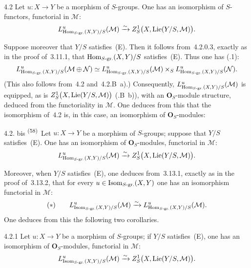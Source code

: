 \begin{proposition}{4.2}\label{II.4.2.prop}
Let \(u\colon X\to Y\) be a morphism of \(S\)-groups. One has an isomorphism
of \(S\)-functors, functorial in \(\mathcal{M}\):
\[
L^{u}_{\operatorname{Hom}_{S\text{-gr.}}(X,Y)/S}(\mathcal{M})
\xrightarrow{\sim}
Z^{1}_{S}\bigl(X,\operatorname{Lie}(Y/S,\mathcal{M})\bigr).
\]
\end{proposition}

{\renewcommand{\thefootnote}{(58)}}
Suppose moreover that \(Y/S\) satisfies~(E). Then it follows from~4.2.0.3,
exactly as in the proof of~3.11.1, that
\(\operatorname{Hom}_{S\text{-gr.}}(X,Y)/S\) satisfies~(E). Thus one has (.1):
\[
L^{u}_{\operatorname{Hom}_{S\text{-gr.}}(X,Y)/S}(\mathcal{M}\oplus\mathcal{N})
\simeq
L^{u}_{\operatorname{Hom}_{S\text{-gr.}}(X,Y)/S}(\mathcal{M})
\times_{S}
L^{u}_{\operatorname{Hom}_{S\text{-gr.}}(X,Y)/S}(\mathcal{N}).
\]
(This also follows from~4.2 and~4.2.B~a).)
Consequently,
\(L^{u}_{\operatorname{Hom}_{S\text{-gr.}}(X,Y)/S}(\mathcal{M})\) is equipped, as is
\(Z^{1}_{S}\bigl(X,\operatorname{Lie}(Y/S,\mathcal{M})\bigr)\) (.B~b)), with an
\(\mathbf{O}_{S}\)-module structure, deduced from the functoriality in
\(\mathcal{M}\). One deduces from this that the isomorphism of~4.2 is, in
this case, an isomorphism of \(\mathbf{O}_{S}\)-modules:

\begin{proposition}{4.2. bis}\label{II.4.2.bis}
\textsuperscript{(58)}\
Let \(u\colon X\to Y\) be a morphism of \(S\)-groups; suppose that \(Y/S\)
satisfies~(E). One has an isomorphism of \(\mathbf{O}_{S}\)-modules,
functorial in \(\mathcal{M}\):
\[
L^{u}_{\operatorname{Hom}_{S\text{-gr.}}(X,Y)/S}(\mathcal{M})
\xrightarrow{\sim}
Z^{1}_{S}\bigl(X,\operatorname{Lie}(Y/S,\mathcal{M})\bigr).
\]
\end{proposition}

Moreover, when \(Y/S\) satisfies~(E), one deduces from~3.13.1, exactly as in
the proof of~3.13.2, that for every \(u\in\operatorname{Isom}_{S\text{-gr.}}(X,Y)\) one has
an isomorphism functorial in \(\mathcal{M}\):
\[
(*)\qquad
L^{u}_{\operatorname{Isom}_{S\text{-gr.}}(X,Y)/S}(\mathcal{M})
\xrightarrow{\sim}
L^{u}_{\operatorname{Hom}_{S\text{-gr.}}(X,Y)/S}(\mathcal{M}).
\]
One deduces from this the following two corollaries.

\begin{corollary}{4.2.1}\label{II.4.2.1}
Let \(u\colon X\to Y\) be a morphism of \(S\)-groups; if \(Y/S\)
satisfies~(E), one has an isomorphism of \(\mathbf{O}_{S}\)-modules,
functorial in \(\mathcal{M}\):
\[
L^{u}_{\operatorname{Isom}_{S\text{-gr.}}(X,Y)/S}(\mathcal{M})
\xrightarrow{\sim}
Z^{1}_{S}\bigl(X,\operatorname{Lie}(Y/S,\mathcal{M})\bigr).
\]
\end{corollary}

